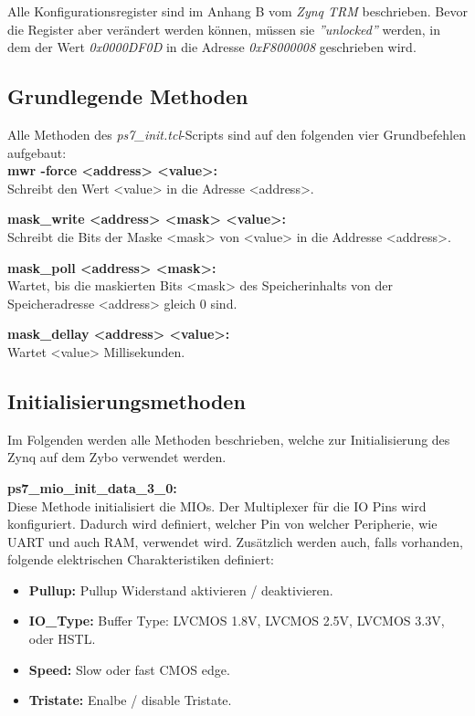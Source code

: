 Alle Konfigurationsregister sind im Anhang B vom \textit{Zynq TRM}\cite{bib:ZynqTechnicalReferenceManual} beschrieben.
Bevor die Register aber verändert werden können, müssen sie \textit{''unlocked''} werden, in dem der Wert \textit{0x0000DF0D} in die Adresse \textit{0xF8000008} geschrieben wird.


\subsection{Grundlegende Methoden}
Alle Methoden des \textit{ps7\_init.tcl}-Scripts sind auf den folgenden vier Grundbefehlen aufgebaut:\\
\textbf{mwr -force <address> <value>: }\\
Schreibt den Wert <value> in die Adresse <address>.

\textbf{mask\_write <address> <mask> <value>: }\\
Schreibt die Bits der Maske <mask> von <value> in die Addresse <address>.

\textbf{mask\_poll <address> <mask>:  }\\
Wartet, bis die maskierten Bits <mask> des Speicherinhalts von der Speicheradresse <address> gleich 0 sind.

\textbf{mask\_dellay <address> <value>:}\\
Wartet <value> Millisekunden.



\subsection{Initialisierungsmethoden}
Im Folgenden werden alle Methoden beschrieben, welche zur Initialisierung des Zynq auf dem Zybo verwendet werden.

\textbf{ps7\_mio\_init\_data\_3\_0:}\\
Diese Methode initialisiert die MIOs.
Der Multiplexer für die IO Pins wird konfiguriert.
Dadurch wird definiert, welcher Pin von welcher Peripherie, wie UART und auch RAM, verwendet wird.
Zusätzlich werden auch, falls vorhanden, folgende elektrischen Charakteristiken definiert:
\begin{itemize}
\item \textbf{Pullup:} Pullup Widerstand aktivieren / deaktivieren.
\item \textbf{IO\_Type:} Buffer Type: LVCMOS 1.8V, LVCMOS 2.5V, LVCMOS 3.3V,  oder HSTL.
\item \textbf{Speed:} Slow oder fast CMOS edge.
\item \textbf{Tristate:} Enalbe / disable Tristate.
\end{itemize} 


